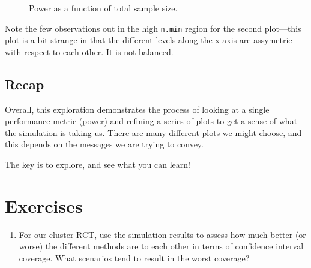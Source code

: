 \documentclass[
]{book}
\providecommand{\tightlist}{%
  \setlength{\itemsep}{0pt}\setlength{\parskip}{0pt}}
\begin{document}
\begin{figure}

{\centering {}

}

\caption{Power as a function of total sample size.}\label{fig:plotA}
\end{figure}

Note the few observations out in the high \texttt{n.min} region for the second
plot---this plot is a bit strange in that the different levels along the
x-axis are assymetric with respect to each other. It is not balanced.

\subsection{Recap}\label{recap}

Overall, this exploration demonstrates the process of looking at a single performance metric (power) and refining a series of plots to get a sense of what the simulation is taking us.
There are many different plots we might choose, and this depends on the messages we are trying to convey.

The key is to explore, and see what you can learn!

\section{Exercises}\label{exercises-7}

\begin{enumerate}
\def\labelenumi{\arabic{enumi})}
\tightlist
\item
  For our cluster RCT, use the simulation results to assess how much better (or worse) the different methods are to each other in terms of confidence interval coverage. What scenarios tend to result in the worst coverage?
\end{enumerate}
\end{document}
